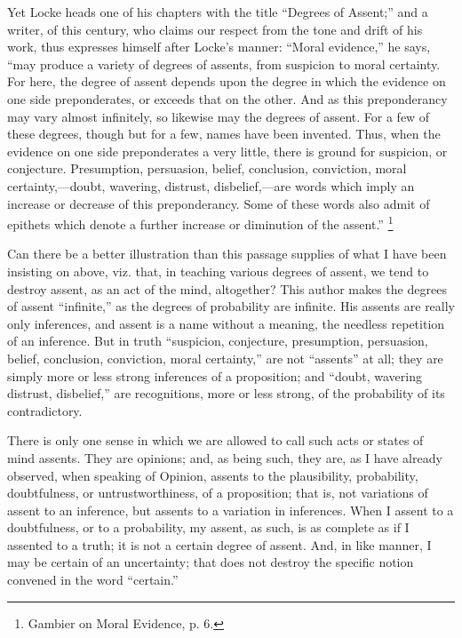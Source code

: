 Yet Locke heads one of his chapters with the title ``Degrees of
Assent;'' and a writer, of this century, who claims our respect
from the tone and drift of his work, thus expresses himself after
Locke's manner: ``Moral evidence,'' he says, ``may produce
a variety of degrees of assents, from suspicion to moral certainty.
For here, the degree of assent depends upon the degree in which the
evidence on one side preponderates, or exceeds that on the other. And
as this preponderancy may vary almost infinitely, so likewise may the
degrees of assent. For a few of these degrees, though but for a few,
names have been invented. Thus, when the evidence on one side
preponderates a very little, there is ground for suspicion, or
conjecture. Presumption, persuasion, belief, conclusion, conviction,
moral certainty,—doubt, wavering, distrust, disbelief,—are words
which imply an increase or decrease of this preponderancy. Some of
these words also admit of epithets which denote a further increase or
diminution of the assent.'' \footnote{Gambier on
Moral Evidence, p. 6.}

Can there be a better illustration than this passage supplies of
what I have been insisting on above, viz. that, in teaching various
degrees of assent, we tend to destroy assent, as an act of the mind,
altogether? This author makes the degrees of assent
``infinite,'' as the degrees of probability are infinite. His
assents are really only inferences, and assent is a name without a
meaning, the needless repetition of an inference. But in truth
``suspicion, conjecture, presumption, persuasion, belief,
conclusion, conviction, moral certainty,'' are not
``assents'' at all; they are simply more or less strong
inferences of a proposition; and ``doubt, wavering distrust,
disbelief,'' are recognitions, more or less strong, of the
probability of its contradictory.

There is only one sense in which we are allowed to call such acts
or states of mind assents. They are opinions; and, as being such, they
are, as I have already observed, when speaking of Opinion, assents to
the plausibility, probability, doubtfulness, or untrustworthiness, of
a proposition; that is, not variations of assent to an inference, but
assents to a variation in inferences. When I assent to a doubtfulness,
or to a probability, my assent, as such, is as complete as if I
assented to a truth; it is not a certain degree of assent. And, in
like manner, I may be certain of an uncertainty; that does not destroy
the specific notion convened in the word ``certain.''

